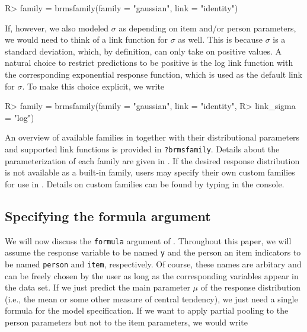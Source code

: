 \documentclass[jss]{jss}
\begin{document}
\begin{CodeChunk}

\begin{CodeInput}
R> family = brmsfamily(family = "gaussian", link = "identity")
\end{CodeInput}
\end{CodeChunk}

If, however, we also modeled \(\sigma\) as depending on item and/or
person parameters, we would need to think of a link function for
\(\sigma\) as well. This is because \(\sigma\) is a standard deviation,
which, by definition, can only take on positive values. A natural choice
to restrict predictions to be positive is the log link function with the
corresponding exponential response function, which is used as the
default link for \(\sigma\). To make this choice explicit, we write

\begin{CodeChunk}

\begin{CodeInput}
R> family = brmsfamily(family = "gaussian", link = "identity",
R>                     link_sigma = "log")
\end{CodeInput}
\end{CodeChunk}

An overview of available families in  together with their
distributional parameters and supported link functions is provided in
\texttt{?brmsfamily}. Details about the parameterization of each family
are given in . If the desired response
distribution is not available as a built-in family, users may specify
their own custom families for use in . Details on custom
families can be found by typing 
in the console.

\hypertarget{formula-prior}{%
\subsection{Specifying the formula argument}\label{formula-prior}}

We will now discuss the \texttt{formula} argument of .
Throughout this paper, we will assume the response variable to be named
\texttt{y} and the person an item indicators to be named \texttt{person}
and \texttt{item}, respectively. Of course, these names are arbitary and
can be freely chosen by the user as long as the corresponding variables
appear in the data set. If we just predict the main parameter \(\mu\) of
the response distribution (i.e., the mean or some other measure of
central tendency), we just need a single  formula for the
model specification. If we want to apply partial pooling to the person
parameters but not to the item parameters, we would write
\end{document}
